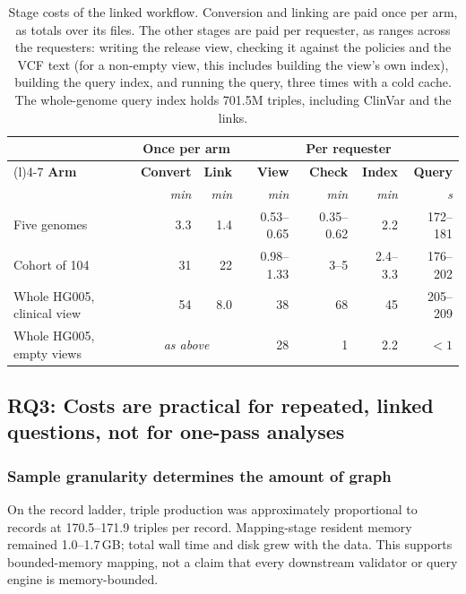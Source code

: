 \documentclass[pdflatex,sn-mathphys-num]{sn-jnl}
\begin{document}
\begin{table}[!htbp]
\caption{
  Stage costs of the linked workflow. 
  Conversion and linking are paid once per arm, as totals over its files. 
  The other stages are paid per requester, as ranges across the requesters: writing the release view, checking it against the policies and the VCF text (for a non-empty view, this includes building the view's own index), building the query index, and running the query, three times with a cold cache. 
  The whole-genome query index holds 701.5M triples, including ClinVar and the links.
  }\label{tab:usecase-cost}
\centering\footnotesize
\setlength{\tabcolsep}{3pt}\renewcommand{\arraystretch}{1.15}
\begin{tabularx}{\textwidth}{@{}>{\raggedright\arraybackslash}X r r r r r r@{}}
\toprule
 & \multicolumn{2}{c}{\textbf{Once per arm}} & \multicolumn{4}{c}{\textbf{Per requester}}\\
\cmidrule(lr){2-3}\cmidrule(l){4-7}
\textbf{Arm} & \textbf{Convert} & \textbf{Link} & \textbf{View} & \textbf{Check} & \textbf{Index} & \textbf{Query}\\
 & \textit{min} & \textit{min} & \textit{min} & \textit{min} & \textit{min} & \textit{s}\\
\midrule
Five genomes & 3.3 & 1.4 & 0.53--0.65 & 0.35--0.62 & 2.2 & 172--181\\
Cohort of 104 & 31 & 22 & 0.98--1.33 & 3--5 & 2.4--3.3 & 176--202\\
Whole HG005, clinical view & 54 & 8.0 & 38 & 68 & 45 & 205--209\\
Whole HG005, empty views & \multicolumn{2}{c}{\textit{as above}} & 28 & 1 & 2.2 & $<1$\\
\bottomrule
\end{tabularx}
\end{table}

\subsection{RQ3: Costs are practical for repeated, linked questions, not for one-pass analyses}\label{subsec3.3}\label{subsec3.4}\label{subsec3.6}\label{subsec:scale}\label{subsec:regional}
\subsubsection{Sample granularity determines the amount of graph}
On the record ladder, triple production was approximately proportional to records at 170.5--171.9 triples per record. 
Mapping-stage resident memory remained 1.0--1.7\,GB; total wall time and disk grew with the data. 
This supports bounded-memory mapping, not a claim that every downstream validator or query engine is memory-bounded.
\end{document}
